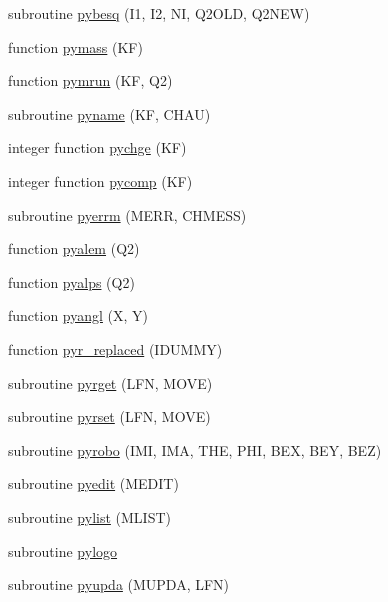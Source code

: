 \begin{DoxyCompactItemize}
subroutine \hyperlink{pythia-6_84_824_8f_a5bcab5f268d645f005de48b6ca8f2761}{pybesq} (I1, I2, N\+I, Q2\+O\+L\+D, Q2\+N\+E\+W)
\item 
function \hyperlink{pythia-6_84_824_8f_ad69903a1054f4f77d45fd8fe4c687aa9}{pymass} (K\+F)
\item 
function \hyperlink{pythia-6_84_824_8f_a342cc0b3b1534ea728c6cc519dfc55dc}{pymrun} (K\+F, Q2)
\item 
subroutine \hyperlink{pythia-6_84_824_8f_ab0dbe916b7d36854c02faf180f41d585}{pyname} (K\+F, C\+H\+A\+U)
\item 
integer function \hyperlink{pythia-6_84_824_8f_a27f75936fde97780175fa2c990bc61cd}{pychge} (K\+F)
\item 
integer function \hyperlink{pythia-6_84_824_8f_a283d6b08c44ddda84be0225d134caa87}{pycomp} (K\+F)
\item 
subroutine \hyperlink{pythia-6_84_824_8f_a8a7efe2037220dc632000fb06895ebca}{pyerrm} (M\+E\+R\+R, C\+H\+M\+E\+S\+S)
\item 
function \hyperlink{pythia-6_84_824_8f_ad950c8536b8d340b350441139b4b309e}{pyalem} (Q2)
\item 
function \hyperlink{pythia-6_84_824_8f_a29c95baea28af87f8639a7f77a68edc5}{pyalps} (Q2)
\item 
function \hyperlink{pythia-6_84_824_8f_aa8c99978a55999fa0b1fd2a946d8553a}{pyangl} (X, Y)
\item 
function \hyperlink{pythia-6_84_824_8f_ace6d89d3e1eb016817f7cdced0f69c90}{pyr\+\_\+replaced} (I\+D\+U\+M\+M\+Y)
\item 
subroutine \hyperlink{pythia-6_84_824_8f_a802d1a9a29fd3ada7eb9fefb6ef6ee90}{pyrget} (L\+F\+N, M\+O\+V\+E)
\item 
subroutine \hyperlink{pythia-6_84_824_8f_a7be392ff7afd3383f822dedc45582fe7}{pyrset} (L\+F\+N, M\+O\+V\+E)
\item 
subroutine \hyperlink{pythia-6_84_824_8f_a98ffa3df00dbe1c8a9944e3453e44580}{pyrobo} (I\+M\+I, I\+M\+A, T\+H\+E, P\+H\+I, B\+E\+X, B\+E\+Y, B\+E\+Z)
\item 
subroutine \hyperlink{pythia-6_84_824_8f_a24316692a5e74fd624bf30b67b745bc3}{pyedit} (M\+E\+D\+I\+T)
\item 
subroutine \hyperlink{pythia-6_84_824_8f_acc54128638bbd93cf630e1576f91d443}{pylist} (M\+L\+I\+S\+T)
\item 
subroutine \hyperlink{pythia-6_84_824_8f_a56718d08dbb42b3b978fc9b5bd6970e6}{pylogo}
\item 
subroutine \hyperlink{pythia-6_84_824_8f_af3fa5a55b3c997c4b9528497a6c9d96d}{pyupda} (M\+U\+P\+D\+A, L\+F\+N)

\end{DoxyCompactItemize}
